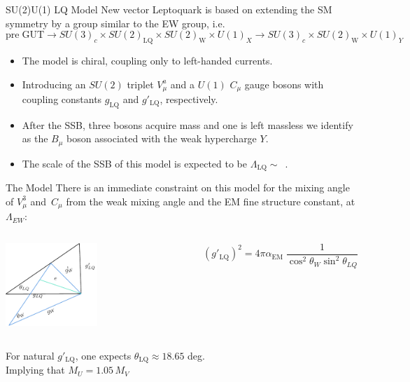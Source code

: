 \documentclass[9pt,usenames,dvipsnames]{beamer}
\begin{document}
\begin{frame}{ SU(2)\times U(1) LQ Model}
New vector Leptoquark is based on extending the SM symmetry by a group similar to the EW group, i.e.
\[   \mathrm{pre\;GUT} \longrightarrow SU(3)_c \times SU(2)_{\text{LQ}} \times SU(2)_{\mathrm{W}} \times U(1)_{X} \longrightarrow  SU(3)_c \times SU(2)_{\mathrm{W}} \times U(1)_{Y} \] \pause
\begin{itemize}
	\item The model is chiral, coupling only to left-handed currents. \pause
	\item  Introducing an $SU(2)$ triplet $ V^a_\mu$ and a $U(1)$ $C_\mu$ gauge bosons with coupling constants $ g_{\mathrm{LQ}}$ and  $g'_{\mathrm{LQ}}$, respectively.
	\item After the SSB, three bosons acquire mass and one is left massless we identify as the $B_\mu$ boson associated with the weak hypercharge $Y$. \pause
	\item The scale of the SSB of this model is expected to be $\Lambda_{\mathrm{LQ}}\sim$~\TeV. 
\end{itemize}
\end{frame}
\begin{frame}{The Model}
	There is an immediate constraint on this model for the mixing angle of $ V^3_\mu$ and~$ C_\mu$ from the weak mixing angle and the EM fine structure constant, at $\Lambda_{EW}$:
	\begin{columns}[c]
		\begin{center}
			\includegraphics[width= 0.5\textwidth]{./assets/triangles} 
		\end{center}
		\[( g'_{\mathrm{LQ}})^2=4 \pi \alpha_{\mathrm{EM}}\; \frac{1}{\cos^2\theta_W \sin^2\theta_{LQ}} \]	
	\end{columns}
	For natural $ g'_{\mathrm{LQ}}$, one expects $ \theta_{\mathrm{LQ}} \approx 18.65$ deg. \\ Implying that $M_U = 1.05 \, M_V$
\end{frame}
\end{document}
